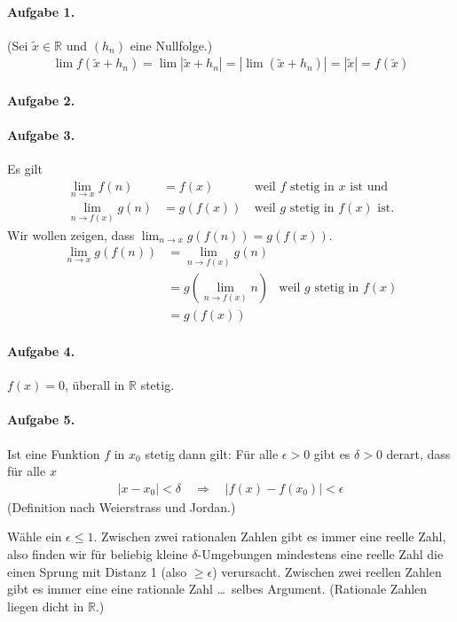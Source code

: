 \documentclass{article}
\begin{document}
\paragraph{Aufgabe 1.} (Sei $\tilde{x} \in \mathbb{R}$ und $(h_n)$ eine Nullfolge.)
\begin{align*}
    \lim f(\tilde{x} + h_n) = \lim |\tilde{x} + h_n| = |\lim(\tilde{x} + h_n)| = |\tilde{x}| = f(\tilde{x})
\end{align*}

\paragraph{Aufgabe 2.}

\paragraph{Aufgabe 3.}
Es gilt
\begin{align*}
    \lim_{n \to x} f(n) &= f(x)\ &\text{weil $f$ stetig in $x$ ist und} \\
    \lim_{n \to f(x)} g(n) &= g(f(x))\ &\text{weil $g$ stetig in $f(x)$ ist.}
\end{align*}
Wir wollen zeigen, dass $\lim_{n \to x} g(f(n)) = g(f(x))$.
\begin{align*}
    \lim_{n \to x} g(f(n)) &= \lim_{n \to f(x)} g(n) \\
    &= g\left(\lim_{n \to f(x)} n\right) & \text{weil $g$ stetig in $f(x)$}\\
    &= g\left(f(x)\right)
\end{align*}

\paragraph{Aufgabe 4.} $f(x) = 0$, überall in $\mathbb{R}$ stetig.

\paragraph{Aufgabe 5.}

Ist eine Funktion $f$ in $x_0$ stetig dann gilt: Für alle $\epsilon > 0$ gibt es $\delta > 0$ derart, dass für alle $x$
\begin{align*}
    |x - x_0| < \delta \quad\Longrightarrow\quad |f(x) - f(x_0)| < \epsilon
\end{align*}
(Definition nach Weierstrass und Jordan.)

Wähle ein $\epsilon \leq 1$. Zwischen zwei rationalen Zahlen gibt es immer eine reelle Zahl, also finden wir für beliebig kleine $\delta$-Umgebungen mindestens eine reelle Zahl die einen Sprung mit Distanz 1 (also $\geq \epsilon$) verursacht. Zwischen zwei reellen Zahlen gibt es immer eine eine rationale Zahl \ldots\ selbes Argument. (Rationale Zahlen liegen dicht in $\mathbb{R}$.)
\end{document}
